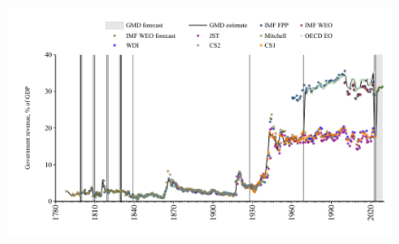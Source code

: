 \documentclass[12pt,a4paper,landscape]{article}
\begin{document}
\begin{adjustbox}{max totalsize={\paperwidth}{\paperheight},center}
\begin{minipage}[t][\textheight][t]{\textwidth}
\begin{table}[H]
\begin{tabular}{|l|l|l|}
\hline
\end{tabular}
\end{table}
\begin{figure}[H]
\centering
\includegraphics[width=\textwidth,height=0.6\textheight,keepaspectratio]{graphs/USA_govrev_GDP.pdf}
\end{figure}
\end{minipage}
\end{adjustbox}
\end{document}
